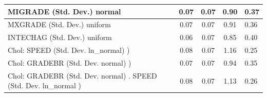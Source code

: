 \begin{table}
\begin{center}
\begin{tabular}{|l|l|c|c|c|l|}
			\hline
			MIGRADE (Std. Dev.) normal &  & 0.07 & 0.07 & 0.90 & 0.37 \\
			\hline
			MXGRADE (Std. Dev.) uniform &  & 0.07 & 0.07 & 0.91 & 0.36 \\
			\hline
			INTECHAG (Std. Dev.) uniform &  & 0.06 & 0.07 & 0.85 & 0.40 \\
			\hline
			 Chol: SPEED (Std. Dev. ln_normal) ) &  & 0.08 & 0.07 & 1.16 & 0.25 \\
			\hline
			 Chol: GRADEBR (Std. Dev. normal) ) &  & 0.07 & 0.07 & 0.94 & 0.35 \\
			\hline
			 Chol: GRADEBR (Std. Dev. normal) . SPEED (Std. Dev.   ln_normal ) &  & 0.08 & 0.07 & 1.13 & 0.26 \\
			\hline
		\end{tabular}
	\end{center}
\end{table}